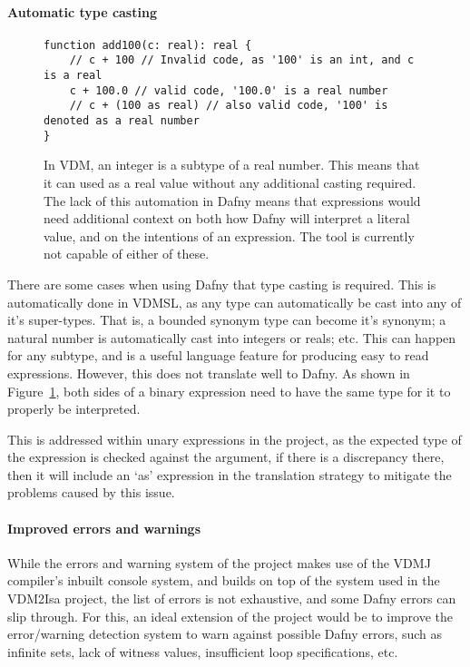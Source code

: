 \documentclass{entcs}
\begin{document}
\paragraph{Automatic type casting}

\begin{figure}[h]
	\begin{center}
        \begin{lstlisting}
function add100(c: real): real {
    // c + 100 // Invalid code, as '100' is an int, and c is a real
    c + 100.0 // valid code, '100.0' is a real number
    // c + (100 as real) // also valid code, '100' is denoted as a real number
}
        \end{lstlisting}
		\caption{In VDM, an integer is a subtype of a real number. This means that it can used as a real value without any additional casting required. The lack of this automation in Dafny means that expressions would need additional context on both how Dafny will interpret a literal value, and on the intentions of an expression. The tool is currently not capable of either of these.}\label{fig:dafny_no_casting}
	\end{center}
\end{figure}

There are some cases when using Dafny that type casting is required. This is automatically done in VDMSL, as any type can automatically be cast into any of it's super-types. That is, a bounded synonym type can become it's synonym; a natural number is automatically cast into integers or reals; etc. This can happen for any subtype, and is a useful language feature for producing easy to read expressions. However, this does not translate well to Dafny. As shown in Figure~\ref{fig:dafny_no_casting}, both sides of a binary expression need to have the same type for it to properly be interpreted. 

This is addressed within unary expressions in the project, as the expected type of the expression is checked against the argument, if there is a discrepancy there, then it will include an `as' expression in the translation strategy to mitigate the problems caused by this issue.

\paragraph{Improved errors and warnings}

While the errors and warning system of the project makes use of the VDMJ compiler's inbuilt console system, and builds on top of the system used in the VDM2Isa project, the list of errors is not exhaustive, and some Dafny errors can slip through. For this, an ideal extension of the project would be to improve the error/warning detection system to warn against possible Dafny errors, such as infinite sets, lack of witness values, insufficient loop specifications, etc. 
\end{document}
